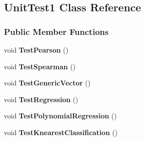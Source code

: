 \hypertarget{classUnitTestProject_1_1UnitTest1}{}\subsection{Unit\+Test1 Class Reference}
\label{classUnitTestProject_1_1UnitTest1}
\subsubsection*{Public Member Functions}
\begin{DoxyCompactItemize}
\item 
\mbox{\label{classUnitTestProject_1_1UnitTest1_a0457f8d22c2f03ca03d553c8685ee558}} 
void {\bfseries Test\+Pearson} ()
\item 
\mbox{\label{classUnitTestProject_1_1UnitTest1_a5ec14ad895c0aba265da1197c8089738}} 
void {\bfseries Test\+Spearman} ()
\item 
\mbox{\label{classUnitTestProject_1_1UnitTest1_a863cf7bb5490492fc538cb7bf1c9bfd3}} 
void {\bfseries Test\+Generic\+Vector} ()
\item 
\mbox{\label{classUnitTestProject_1_1UnitTest1_a551f237078672d91a0ac2b80bd9091e6}} 
void {\bfseries Test\+Regression} ()
\item 
\mbox{\label{classUnitTestProject_1_1UnitTest1_a0dc2fad5ab4273271f439802d7e75acc}} 
void {\bfseries Test\+Polynomial\+Regression} ()
\item 
\mbox{\label{classUnitTestProject_1_1UnitTest1_a25aa2f95deb047903806487597393927}} 
void {\bfseries Test\+Knearest\+Classification} ()
\end{DoxyCompactItemize}
